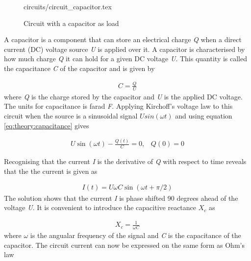 \documentclass[class=book, crop=false]{standalone}
\begin{document}
\begin{figure}[ht!]
    \center
    {circuits/circuit_capacitor.tex}
    \caption[size = 9]
    {Circuit with a capacitor as load}\label{fig:theory:circuit_capacitor}
\end{figure}



A capacitor is a component that can store an electrical charge \textit{Q} when a direct current (DC) voltage source \textit{U} is applied over it. A capacitor is characterised by how much charge \textit{Q} it can hold for a given DC voltage \textit{U}. This quantity is called the capacitance \textit{C} of the capacitor and is given by 

\begin{equation}
   \begin{aligned}\label{eq:theory:capacitance}
C = \frac{Q}{U}
\end{aligned} 
\end{equation}
where \textit{Q} is the charge stored by the capacitor and \textit{U} is the applied DC voltage. The units for capacitance is farad \textit{F}. Applying Kirchoff's voltage law to this circuit when the source is a sinusoidal signal $Usin(\omega t)$ and using equation \eqref{eq:theory:capacitance} gives



\begin{equation}
   \begin{aligned}\label{eq:theory:capacitance_diffeq}
U\sin{(\omega t)} - \frac{Q(t)}{C} = 0, \;\;\; Q(0) = 0
\end{aligned} 
\end{equation}

Recognising that the current \textit{I} is the derivative of \textit{Q} with respect to time reveals that the the current is given as

\begin{equation}
   \begin{aligned}\label{eq:theory:capacitance_diffeq_solved}
I(t) = U\omega C \sin{(\omega t + \pi/2)}
\end{aligned} 
\end{equation}
The solution shows that the current \textit{I} is phase shifted 90 degrees ahead of the voltage \textit{U}. It is convenient to introduce the capacitive reactance $X_{c}$ as



\begin{equation}
   \begin{aligned}\label{eq:theory:reactance_capacitive}
X_{c} = \frac{1}{\omega C}
\end{aligned} 
\end{equation}
where $\omega$ is the angualar frequency of the signal and \textit{C} is the capacitance of the capacitor. The circuit current can now be expressed on the same form as Ohm's law
\end{document}
